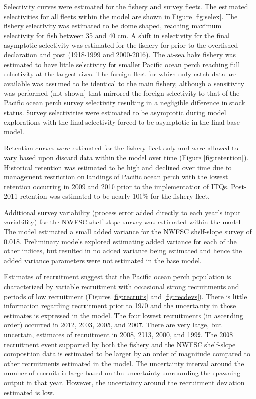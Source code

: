 \documentclass[12pt,]{article}
\begin{document}
Selectivity curves were estimated for the fishery and survey fleets. The
estimated selectivities for all fleets within the model are shown in
Figure \ref{fig:selex}. The fishery selectivity was estimated to be dome
shaped, reaching maximum selectivity for fish between 35 and 40 cm. A
shift in selectivity for the final asymptotic selectivity was estimated
for the fishery for prior to the overfished declaration and post
(1918-1999 and 2000-2016). The at-sea hake fishery was estimated to have
little selectivity for smaller Pacific ocean perch reaching full
selectivity at the largest sizes. The foreign fleet for which only catch
data are available was assumed to be identical to the main fishery,
although a sensitivity was performed (not shown) that mirrored the
foreign selectivity to that of the Pacific ocean perch survey
selectivity resulting in a negligible difference in stock status. Survey
selectivities were estimated to be asymptotic during model explorations
with the final selectivity forced to be asymptotic in the final base
model.

Retention curves were estimated for the fishery fleet only and were
allowed to vary based upon discard data within the model over time
(Figure \ref{fig:retention}). Historical retention was estimated to be
high and declined over time due to management restriction on landings of
Pacific ocean perch with the lowest retention occurring in 2009 and 2010
prior to the implementation of ITQs. Post-2011 retention was estimated
to be nearly 100\% for the fishery fleet.

Additional survey variability (process error added directly to each
year's input variability) for the NWFSC shelf-slope survey was estimated
within the model. The model estimated a small added variance for the
NWFSC shelf-slope survey of 0.018. Preliminary models explored
estimating added variance for each of the other indices, but resulted in
no added variance being estimated and hence the added variance
parameters were not estimated in the base model.

Estimates of recruitment suggest that the Pacific ocean perch population
is characterized by variable recruitment with occasional strong
recruitments and periods of low recruitment (Figures \ref{fig:recruits}
and \ref{fig:recdevs}). There is little information regarding
recruitment prior to 1970 and the uncertainty in those estimates is
expressed in the model. The four lowest recruitments (in ascending
order) occurred in 2012, 2003, 2005, and 2007. There are very large, but
uncertain, estimates of recruitment in 2008, 2013, 2000, and 1999. The
2008 recruitment event supported by both the fishery and the NWFSC
shelf-slope composition data is estimated to be larger by an order of
magnitude compared to other recruitments estimated in the model. The
uncertainty interval around the number of recruits is large based on the
uncertainty surrounding the spawning output in that year. However, the
uncertainty around the recruitment deviation estimated is low.
\end{document}
